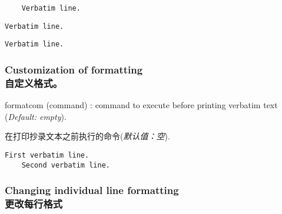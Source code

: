 \documentclass[twoside]{article}
\makeatletter
\providecommand\optname[1]{\textsf{#1}}
\newenvironment{optlist}{\begin{description}%
  \renewcommand\makelabel[1]{%
    \descriptionlabel{\mdseries\optname{##1}}}%
  \itemsep0.25\itemsep}%
 {\end{description}}
\def\thinskip{\hskip 0.16667em\relax}
\def\endash{--}
\def\emdash{\endash-}
\def\d@sh#1#2{\unskip#1\thinskip#2\thinskip\ignorespaces}
\def\Dash{\d@sh\nobreak\emdash}
\newcommand\verbatimTxt{抄录}
\makeatother
\begin{document}

\begin{SideBySideExample}
  \begin{Verbatim}
    Verbatim line.
  \end{Verbatim}

  \begin{Verbatim}[gobble=2]
    Verbatim line.
  \end{Verbatim}

  \begin{Verbatim}[gobble=8]
    Verbatim line.
  \end{Verbatim}
\end{SideBySideExample}

\subsubsection{Customization of formatting\\自定义格式。}


\begin{optlist}
  \item[formatcom (command)]: command to execute before printing verbatim
  text
  (\emph{Default: empty}).

在打印抄录文本之前执行的命令(\emph{默认值：空}).
\end{optlist}


\begin{SideBySideExample}
  \begin{Verbatim}[formatcom=\color{red}]
    First verbatim line.
    Second verbatim line.
  \end{Verbatim}
\end{SideBySideExample}

\subsubsection{Changing individual line formatting\\更改每行格式}
\end{document}
